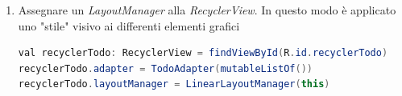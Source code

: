 \documentclass{article}
\begin{document}
\begin{enumerate}
\begin{itemize}
  \end{itemize}
  \item Assegnare un \textit{LayoutManager} alla \textit{RecyclerView}. In questo modo è applicato uno "stile" visivo ai differenti elementi grafici  
  \begin{lstlisting}[language=JAVA, title=Assegnamento del layout ai nuovi oggetti grafici contenuti nela RecyclerView]
val recyclerTodo: RecyclerView = findViewById(R.id.recyclerTodo)
recyclerTodo.adapter = TodoAdapter(mutableListOf())
recyclerTodo.layoutManager = LinearLayoutManager(this)
  \end{lstlisting}
\end{enumerate} 
\end{document}
